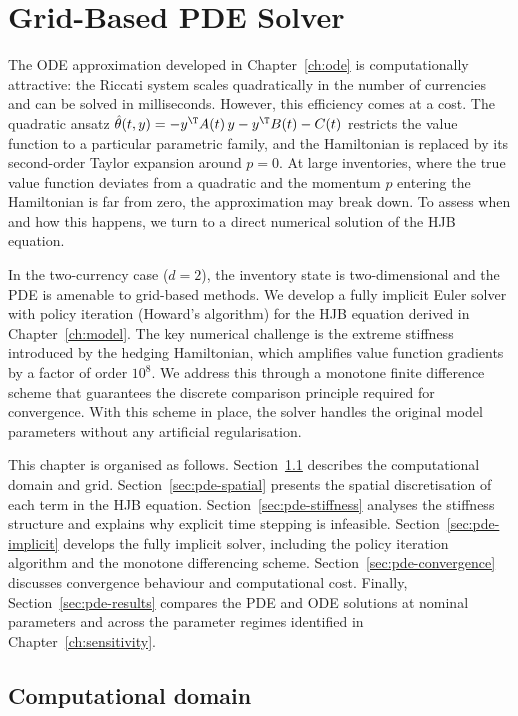 \chapter{Grid-Based PDE Solver}
\label{ch:pde}

The ODE approximation developed in Chapter~\ref{ch:ode} is computationally attractive: the Riccati system scales quadratically in the number of currencies and can be solved in milliseconds. However, this efficiency comes at a cost. The quadratic ansatz $\hat\theta(t,y) = -y^\T A(t)\,y - y^\T B(t) - C(t)$ restricts the value function to a particular parametric family, and the Hamiltonian is replaced by its second-order Taylor expansion around $p = 0$. At large inventories, where the true value function deviates from a quadratic and the momentum $p$ entering the Hamiltonian is far from zero, the approximation may break down. To assess when and how this happens, we turn to a direct numerical solution of the HJB equation.

In the two-currency case ($d = 2$), the inventory state is two-dimensional and the PDE is amenable to grid-based methods. We develop a fully implicit Euler solver with policy iteration (Howard's algorithm) for the HJB equation derived in Chapter~\ref{ch:model}. The key numerical challenge is the extreme stiffness introduced by the hedging Hamiltonian, which amplifies value function gradients by a factor of order $10^8$. We address this through a monotone finite difference scheme that guarantees the discrete comparison principle required for convergence. With this scheme in place, the solver handles the original model parameters without any artificial regularisation.

This chapter is organised as follows. Section~\ref{sec:pde-domain} describes the computational domain and grid. Section~\ref{sec:pde-spatial} presents the spatial discretisation of each term in the HJB equation. Section~\ref{sec:pde-stiffness} analyses the stiffness structure and explains why explicit time stepping is infeasible. Section~\ref{sec:pde-implicit} develops the fully implicit solver, including the policy iteration algorithm and the monotone differencing scheme. Section~\ref{sec:pde-convergence} discusses convergence behaviour and computational cost. Finally, Section~\ref{sec:pde-results} compares the PDE and ODE solutions at nominal parameters and across the parameter regimes identified in Chapter~\ref{ch:sensitivity}.


\section{Computational domain}
\label{sec:pde-domain}

